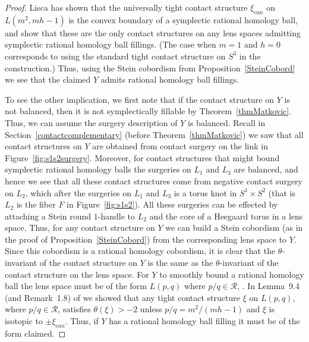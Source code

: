 \documentclass[11pt]{amsart}
\theoremstyle{plain}
\theoremstyle{definition}
\theoremstyle{remark}
\numberwithin{theorem}{section}
\begin{document}
\begin{proof}
Lisca \cite{Lisca08} has shown that the universally tight contact structure $\xi_{can}$ on $L(m^2, mh-1)$ is the convex boundary of a symplectic rational homology ball, and \cite{ChristianLi23, EtnyreRoy21, Lisca08} show that these are the only contact structures on any lens spaces admitting symplectic rational homology ball fillings. (The case when $m=1$ and $h=0$ corresponds to using the standard tight contact structure on $S^3$ in the construction.) Thus, using the Stein cobordism from Proposition~\ref{SteinCobord} we see that the claimed $Y$ admits rational homology ball fillings.  

To see the other implication, we first note that if the contact structure on $Y$ is not balanced, then it is not symplectically fillable by Theorem~\ref{thmMatkovic}. Thus, we can assume the surgery description of $Y$ is balanced. Recall in Section~\ref{contactcomplementary} (before Theorem~\ref{thmMatkovic}) we saw that all contact structures on $Y$ are obtained from contact surgery on the link in Figure~\ref{fig:s1s2surgery}. Moreover, for contact structures that might bound symplectic rational homology balls the surgeries on $L_1$ and $L_3$ are balanced, and hence we see that all these contact structures come from negative contact surgery on $L_2$, which after the surgeries on $L_1$ and $L_3$ is a torus knot in $S^1\times S^2$ (that is $L_2$ is the fiber $F$ in Figure~\ref{fig:s1s2}). All these surgeries can be effected by attaching a Stein round $1$-handle to $L_2$ and the core of a Heegaard torus in a lens space. Thus, for any contact structure on $Y$ we can build a Stein cobordism (as in the proof of Proposition~\ref{SteinCobord}) from the corresponding lens space to $Y$. Since this cobordism is a rational homology cobordism, it is clear that the $\theta$-invariant of the contact structure on $Y$ is the same as the $\theta$-invariant of the contact structure on the lens space. For $Y$ to smoothly bound a rational homology ball the lens space must be of the form $L(p,q)$ where $p/q\in \mathcal{R}$, \cite{Lisca2007}. In Lemma~9.4 (and Remark~1.8) of \cite{EtnyreOzbagciTosun2025} we showed that any tight contact structure $\xi$ on $L(p,q)$, where $p/q\in \mathcal{R}$, satisfies $\theta (\xi)>-2$ unless $p/q=m^2/(mh-1)$ and $\xi$ is isotopic to $\pm\xi_{can}$. Thus, if $Y$ has a rational homology ball filling it must be of the form claimed. 


\end{proof}
\end{document}
